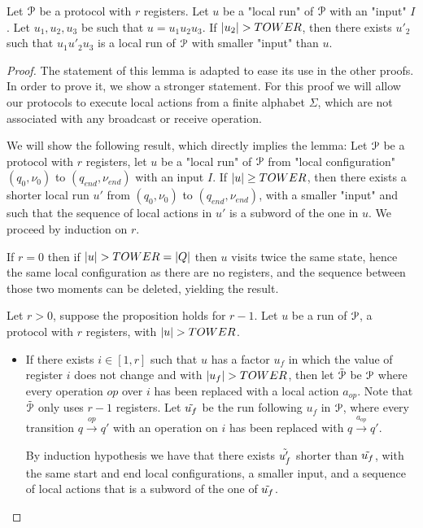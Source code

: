 \begin{lemma}
	\label{lem:short-local-runs}
	Let $\mathcal{P}$ be a protocol with $r$ registers.
	Let $u$ be a "local run" of $\mathcal{P}$ with an "input" $I$.
	Let $u_1, u_2, u_3$ be such that $u=u_1u_2u_3$.
	If $|u_2| > TOWER$, then there exists $u'_2$ such that $u_1u'_2u_3$ is a local run of $\mathcal{P}$ with smaller "input" than $u$. 
\end{lemma}

\begin{proof}
	The statement of this lemma is adapted to ease its use in the other proofs.
	In order to prove it, we show a stronger statement.	
	For this proof we will allow our protocols to execute local actions from a finite alphabet $\Sigma$, which are not associated with any broadcast or receive operation.	
	
	We will show the following result, which directly implies the lemma:
	Let $\mathcal{P}$ be a protocol with $r$ registers, let $u$ be a "local run" of $\mathcal{P}$ from "local configuration" $(q_0, \nu_0)$ to $(q_{end}, \nu_{end})$ with an input $I$. If $|u| \geq TOWER$, then there exists a shorter local run $u'$ from $(q_0, \nu_0)$ to $(q_{end}, \nu_{end})$, with a smaller "input" and such that the sequence of local actions in $u'$ is a subword of the one in $u$.
	We proceed by induction on $r$.
	
	If $r=0$ then if $|u| > TOWER = |Q|$ then $u$ visits twice the same state, hence the same local configuration as there are no registers, and the sequence between those two moments can be deleted, yielding the result.
	
	Let $r>0$, suppose the proposition holds for $r-1$.
	Let $u$ be a run of $\mathcal{P}$, a protocol with $r$ registers, with $|u| > TOWER$.
	
	\begin{itemize}
		\item If there exists $i \in [1,r]$ such that $u$ has a factor $u_f$ in which the value of register $i$ does not change and with $|u_f| > TOWER$, then let $\Tilde{\mathcal{P}}$ be $\mathcal{P}$ where every operation $op$ over $i$ has been replaced with a local action $a_{op}$. Note that $\Tilde{\mathcal{P}}$ only uses $r-1$ registers. 
		Let $\Tilde{u_f}$ be the run following $u_f$ in $\mathcal{P}$, where every transition $q \xrightarrow{op} q'$ with an operation on $i$ has been replaced with $q \xrightarrow{a_{op}} q'$.
		
		By induction hypothesis we have that there exists $\Tilde{u'_f}$ shorter than $\Tilde{u_f}$, with the same start and end local configurations, a smaller input, and a sequence of local actions that is a subword of the one of $\Tilde{u_f}$.
		

\end{itemize}
\end{proof}
